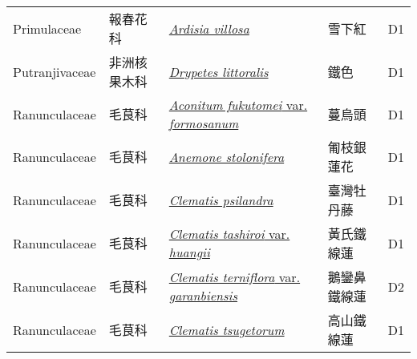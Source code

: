 {\begin{longtable}{L{2.5cm}L{2cm}L{5cm}L{2.5cm}L{3cm}}
    Primulaceae & 報春花科 & \href{http://www.theplantlist.org/tpl1.1/search?q=Ardisia+villosa}{\textit{Ardisia villosa} } & 雪下紅 & D1    \\
    Putranjivaceae & 非洲核果木科 & \href{http://www.theplantlist.org/tpl1.1/search?q=Drypetes+littoralis}{\textit{Drypetes littoralis} } & 鐵色 & D1    \\
    Ranunculaceae & 毛茛科 & \href{http://www.theplantlist.org/tpl1.1/search?q=Aconitum+fukutomei+var.+formosanum}{\textit{Aconitum fukutomei} var. \textit{formosanum} } & 蔓烏頭 & D1    \\
    Ranunculaceae & 毛茛科 & \href{http://www.theplantlist.org/tpl1.1/search?q=Anemone+stolonifera}{\textit{Anemone stolonifera} } & 匍枝銀蓮花 & D1    \\
    Ranunculaceae & 毛茛科 & \href{http://www.theplantlist.org/tpl1.1/search?q=Clematis+psilandra}{\textit{Clematis psilandra} } & 臺灣牡丹藤 & D1    \\
    Ranunculaceae & 毛茛科 & \href{http://www.theplantlist.org/tpl1.1/search?q=Clematis+tashiroi+var.+huangii}{\textit{Clematis tashiroi} var. \textit{huangii} } & 黃氏鐵線蓮 & D1    \\
    Ranunculaceae & 毛茛科 & \href{http://www.theplantlist.org/tpl1.1/search?q=Clematis+terniflora+var.+garanbiensis}{\textit{Clematis terniflora} var. \textit{garanbiensis} } & 鵝鑾鼻鐵線蓮 & D2    \\
    Ranunculaceae & 毛茛科 & \href{http://www.theplantlist.org/tpl1.1/search?q=Clematis+tsugetorum}{\textit{Clematis tsugetorum} } & 高山鐵線蓮 & D1    \\

\end{longtable}}
